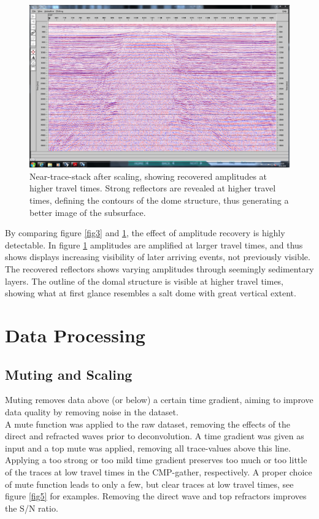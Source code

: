 \documentclass[10pt,a4paper]{article}
\begin{document}
\begin{figure}[H]
\includegraphics[width=\textwidth, trim={1.5cm 1.5cm 1cm 1.5cm},clip]{fig4.jpg}
\caption{Near-trace-stack after scaling, showing recovered amplitudes at higher travel times. Strong reflectors are revealed at higher travel times, defining the contours of the dome structure, thus generating a better image of the subsurface.}
\label{fig4}
\end{figure}


\noindent By comparing figure \ref{fig3} and \ref{fig4}, the effect of amplitude recovery is highly detectable. In figure \ref{fig4} amplitudes are amplified at larger travel times, and thus shows displays increasing visibility of later arriving events, not previously visible. The recovered reflectors shows varying amplitudes through seemingly sedimentary layers. The outline of the domal structure is visible at higher travel times, showing what at first glance resembles a salt dome with great vertical extent.

\section{Data Processing}

\subsection{Muting and Scaling}

Muting removes data above (or below) a certain time gradient, aiming to improve data quality by removing noise in the dataset.
\\
A mute function was applied to the raw dataset, removing the effects of the direct and refracted waves prior to deconvolution. A time gradient was given as input and a top mute was applied, removing all trace-values above this line. Applying a too strong or too mild time gradient preserves too much or too little of the traces at low travel times in the CMP-gather, respectively. A proper choice of mute function leads to only a few, but clear traces at low travel times, see figure \ref{fig5} for examples. Removing the direct wave and top refractors improves the S/N ratio.
\end{document}
